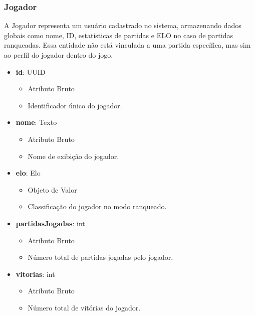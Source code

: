     \subsubsection{Jogador}
    A Jogador representa um usuário cadastrado no sistema, armazenando dados globais como nome, ID, estatísticas de partidas e ELO no caso de partidas ranqueadas. Essa entidade não está vinculada a uma partida específica, mas sim ao perfil do jogador dentro do jogo.
    \begin{itemize}
        \item \textbf{id}: UUID  
              \begin{itemize}
                  \item Atributo Bruto
                  \item Identificador único do jogador.
              \end{itemize}
    
        \item \textbf{nome}: Texto  
              \begin{itemize}
                  \item Atributo Bruto
                  \item Nome de exibição do jogador.
              \end{itemize}
    
        \item \textbf{elo}: Elo  
              \begin{itemize}
                  \item Objeto de Valor
                  \item Classificação do jogador no modo ranqueado.
              \end{itemize}
    
        \item \textbf{partidasJogadas}: int  
              \begin{itemize}
                  \item Atributo Bruto
                  \item Número total de partidas jogadas pelo jogador.
              \end{itemize}
    
        \item \textbf{vitorias}: int  
              \begin{itemize}
                  \item Atributo Bruto
                  \item Número total de vitórias do jogador.
              \end{itemize}
    

\end{itemize}
